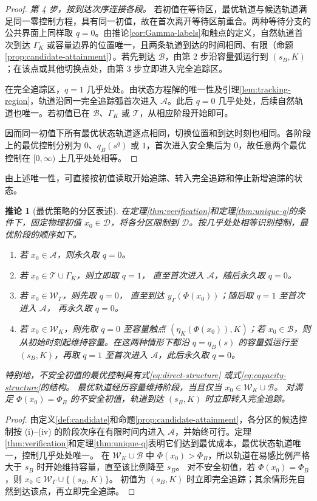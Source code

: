 \documentclass[lang=cn,a4paper,newtx]{elegantpaper}
\theoremstyle{plain}
\newtheorem{papercorollary}[theorem]{推论}
\theoremstyle{definition}
\newcommand{\Acal}{\mathcal A}
\newcommand{\Dcal}{\mathcal D}
\begin{document}
\begin{proof}
\emph{第 4 步，按到达次序连接各段。}
若初值在等待区，最优轨道与候选轨道满足同一零控制方程，具有同一初值，故在首次离开等待区前重合。两种等待分支的公共界面上同样取 $q=0$。由推论\ref{cor:Gamma-labels}和触点的定义，自然轨道首次到达 $\Gamma_K$ 或容量边界的位置唯一，且两条轨道到达的时间相同、有限（命题\ref{prop:candidate-attainment}）。若先到达 $\mathcal B$，由第 2 步沿容量弧运行到 $(s_B,K)$；在该点或其他切换点处，由第 3 步立即进入完全追踪区。

在完全追踪区，$q=1$ 几乎处处。由状态方程解的唯一性及引理\ref{lem:tracking-region}，轨道沿同一完全追踪弧首次进入 $\Acal$。此后 $q=0$ 几乎处处，后续自然轨道也唯一。若初值已在 $\mathcal B$、$\Gamma_K$ 或 $\mathcal T$，从相应阶段开始即可。

因而同一初值下所有最优状态轨道逐点相同，切换位置和到达时刻也相同。各阶段上的最优控制分别为 $0$、$q_B(s^q)$ 或 $1$，首次进入安全集后为 $0$，故任意两个最优控制在 $[0,\infty)$ 上几乎处处相等。
\end{proof}

由上述唯一性，可直接按初值读取开始追踪、转入完全追踪和停止新增追踪的状态。

\begin{papercorollary}[最优策略的分区表述]
\label{cor:optimal-synthesis}
在定理\ref{thm:verification}和定理\ref{thm:unique-q}的条件下，固定物理初值 $x_0\in\Dcal$，将各分区限制到 $\Dcal$。按几乎处处相等识别控制，最优阶段的顺序如下。
\begin{enumerate}[label=\textup{(\roman*)}]
\item 若 $x_0\in\Acal$，则永久取 $q=0$。
\item 若 $x_0\in\mathcal T\cup\Gamma_K$，则立即取 $q=1$，
直至首次进入 $\Acal$，随后永久取 $q=0$。
\item 若 $x_0\in\mathcal W_\Gamma$，则先取 $q=0$，
直至到达 $y_\Gamma(\Phi(x_0))$；随后取 $q=1$ 至首次进入 $\Acal$，
再永久取 $q=0$。
\item 若 $x_0\in\mathcal W_K$，则先取 $q=0$ 至容量触点 $(\eta_K(\Phi(x_0)),K)$；若 $x_0\in\mathcal B$，则从初始时刻起维持容量。在这两种情形下都沿 $q=q_B(s)$ 的容量弧运行至 $(s_B,K)$，再取 $q=1$ 至首次进入 $\Acal$，此后永久取 $q=0$。
\end{enumerate}
特别地，不安全初值的最优控制具有式\eqref{eq:direct-structure}
或式\eqref{eq:capacity-structure}的结构。
最优轨道经历容量维持阶段，当且仅当 $x_0\in\mathcal W_K\cup\mathcal B$。
对满足 $\Phi(x_0)=\Phi_B$ 的不安全初值，轨道到达 $(s_B,K)$ 时立即转入完全追踪。
\end{papercorollary}

\begin{proof}
由定义\ref{def:candidate}和命题\ref{prop:candidate-attainment}，各分区的候选控制按 (i)--(iv) 的阶段次序在有限时间内进入 $\Acal$，并始终可行。定理\ref{thm:verification}和定理\ref{thm:unique-q}表明它们达到最优成本，最优状态轨道唯一，控制几乎处处唯一。
在 $\mathcal W_K\cup\mathcal B$ 中 $\Phi(x_0)>\Phi_B$，所以轨道在易感比例严格大于 $s_B$ 时开始维持容量，直至该比例降至 $s_B$。
对不安全初值，若 $\Phi(x_0)=\Phi_B$，则 $x_0\in\mathcal W_\Gamma\cup\{(s_B,K)\}$。
初值为 $(s_B,K)$ 时立即完全追踪；其余情形先自然到达该点，再立即完全追踪。
\end{proof}
\end{document}
